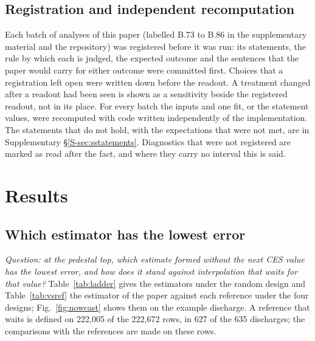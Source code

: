 \documentclass[11pt,a4paper]{article}
\newcommand{\Supp}[1]{Supplementary \S\ref{S-#1}}
\begin{document}
\subsection{Registration and independent recomputation}
\label{sec:methods:reg}

Each batch of analyses of this paper (labelled B.73 to B.86 in the supplementary material
and the repository) was registered before it was run: its statements, the rule by which
each is judged, the expected outcome and the sentences that the paper would carry for
either outcome were committed first. Choices that a registration left open were written
down before the readout. A treatment changed after a readout had been seen is shown as a
sensitivity beside the registered readout, not in its place. For every batch the inputs
and one fit, or the statement values, were recomputed with code written independently of
the implementation. The statements that do not hold, with the expectations that were not
met, are in \Supp{sec:sstatements}. Diagnostics that were not registered are marked as
read after the fact, and where they carry no interval this is said.

\section{Results}
\label{sec:results}

\subsection{Which estimator has the lowest error}
\label{sec:res:best}

\emph{Question: at the pedestal top, which estimate formed without the next CES value
has the lowest error, and how does it stand against interpolation that waits for that
value?} Table~\ref{tab:ladder} gives the estimators under the random design and
Table~\ref{tab:vsref} the estimator of the paper against each reference under the four
designs; Fig.~\ref{fig:nowcast} shows them on the example discharge. A reference that
waits is defined on 222{,}005 of the 222{,}672 rows, in 627 of the 635 discharges; the
comparisons with the references are made on these rows.

\begin{table}[tbp]
  \centering
  \caption{\CapLadder}
  \label{tab:ladder}
  \TabLadder
\end{table}
\end{document}
